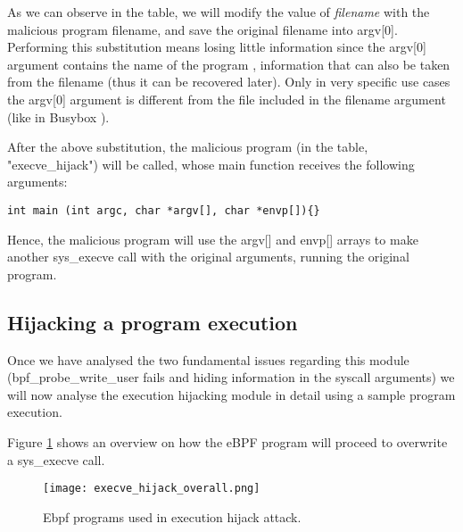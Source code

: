 As we can observe in the table, we will modify the value of \textit{filename} with the malicious program filename, and save the original filename into argv[0]. Performing this substitution means losing little information since the argv[0] argument contains the name of the program \cite{c_standard_main}, information that can also be taken from the filename (thus it can be recovered later). Only in very specific use cases the argv[0] argument is different from the file included in the filename argument (like in Busybox \cite{busybox_argv}). 

After the above substitution, the malicious program (in the table, "execve\_hijack") will be called, whose main function receives the following arguments:

\begin{verbatim}
int main (int argc, char *argv[], char *envp[]){}
\end{verbatim}

Hence, the malicious program will use the argv[] and envp[] arrays to make another sys\_execve call with the original arguments, running the original program. 

\subsection{Hijacking a program execution}
Once we have analysed the two fundamental issues regarding this module (bpf\_probe\_write\_user fails and hiding information in the syscall arguments) we will now analyse the execution hijacking module in detail using a sample program execution.

Figure \ref{fig:execve_hijack_overall} shows an overview on how the eBPF program will proceed to overwrite a sys\_execve call.

\begin{figure}[htbp]
	\centering
	\texttt{[image: execve\_hijack\_overall.png]}
	\caption{Ebpf programs used in execution hijack attack.}
	\label{fig:execve_hijack_overall}
\end{figure}


